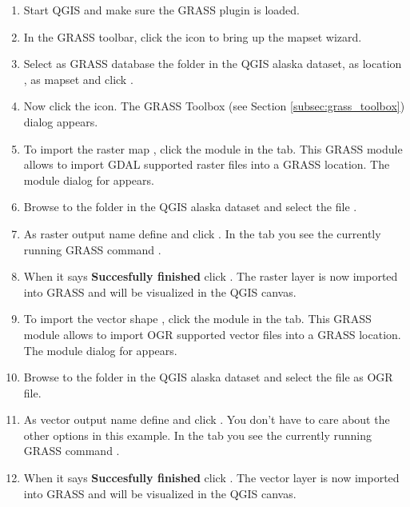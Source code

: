 \begin{enumerate}
  \item Start QGIS and make sure the GRASS plugin is loaded.
  \item In the GRASS toolbar, click the  icon to bring up the mapset wizard.
  \item Select as GRASS database the folder  in the QGIS alaska dataset, as location , as mapset  and click .
  \item Now click the  icon. The GRASS Toolbox (see Section \ref{subsec:grass_toolbox}) dialog appears.
  \item To import the raster map , click the module  in the  tab. This GRASS module allows to import GDAL supported raster files into a GRASS location. The module dialog for  appears.
  \item Browse to the folder  in the QGIS alaska dataset and select the file .
  \item As raster output name define  and click . In the  tab you see the currently running GRASS command .
  \item When it says \textbf{Succesfully finished} click . The  raster layer is now imported into GRASS and will be visualized in the QGIS canvas.
  \item To import the vector shape , click the module  in the  tab. This GRASS module allows to import OGR supported vector files into a GRASS location. The module dialog for  appears.
  \item Browse to the folder  in the QGIS alaska dataset and select the file  as OGR file.
  \item As vector output name define  and click . You don't have to care about the other options in this example. In the  tab you see the currently running GRASS command .
  \item When it says \textbf{Succesfully finished} click . The  vector layer is now imported into GRASS and will be visualized in the QGIS canvas. 
\end{enumerate}


